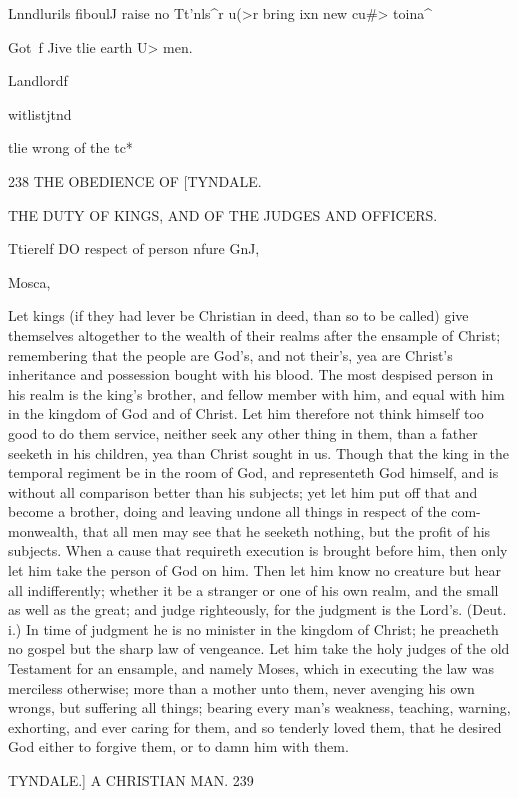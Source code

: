 \documentclass{custom}
\begin{document}
{Lnndlurils 
fiboulJ 
raise no 
Tt'nls^r u(>r 
bring ixn 
new cu#> 
toina^ 

Got\ f Jive 
tlie earth 
U> men. 

Landlordf 

witlistjtnd 

tlie wrong 
of the tc* 


238 
THE OBEDIENCE OF 
[TYNDALE.

THE DUTY OF KINGS, AND OF THE JUDGES 
AND OFFICERS. 

Ttierelf 
DO respect 
of person 
nfure GnJ, 

Mosca, 

Let kings (if they had lever be Christian in deed, than 
so to be called) give themselves altogether to the wealth 
of their realms after the ensample of Christ; remembering 
that the people are God's, and not their's, yea are Christ's 
inheritance and possession bought with his blood. The 
most despised person in his realm is the king's brother, 
and fellow member with him, and equal with him in the 
kingdom of God and of Christ. Let him therefore not 
think himself too good to do them service, neither seek any 
other thing in them, than a father seeketh in his children, 
yea than Christ sought in us. Though that the king in the 
temporal regiment be in the room of God, and representeth 
God himself, and is without all comparison better than 
his subjects; yet let him put off that and become a brother, 
doing and leaving undone all things in respect of the com- 
monwealth, that all men may see that he seeketh nothing, 
but the profit of his subjects. When a cause that requireth 
execution is brought before him, then only let him take the 
person of God on him. Then let him know no creature 
but hear all indifferently; whether it be a stranger or one 
of his own realm, and the small as well as the great; and 
judge righteously, for the judgment is the Lord's. (Deut. 
i.) In time of judgment he is no minister in the kingdom 
of Christ; he preacheth no gospel but the sharp law 
of vengeance. Let him take the holy judges of the old 
Testament for an ensample, and namely Moses, which in 
executing the law was merciless otherwise; more than a 
mother unto them, never avenging his own wrongs, but 
suffering all things; bearing every man's weakness, teaching, 
warning, exhorting, and ever caring for them, and so 
tenderly loved them, that he desired God either to forgive 
them, or to damn him with them. 


TYNDALE.]
A CHRISTIAN MAN.
239

}
\end{document}
